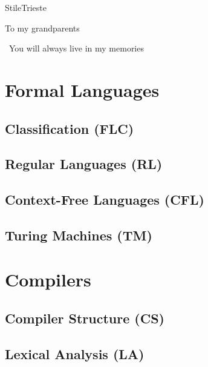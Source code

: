 \documentclass[pdfa,cucitura]{toptesi}
\begin{document}
\english


\expandafter\ifx\csname StileTrieste\endcsname\relax
\else
	\paginavuota
	\begin{dedica}
		To my grandparents

		\textdagger\ You will always live in my memories
	\end{dedica}
	\tomo
\fi

\sommario


\indici

\mainmatter

\part{Formal Languages}

\chapter{Classification (FLC)}


\chapter{Regular Languages (RL)}


\chapter{Context-Free Languages (CFL)}


\chapter{Turing Machines (TM)}

\part{Compilers}

\chapter{Compiler Structure (CS)}


\chapter{Lexical Analysis (LA)}

\end{document}
